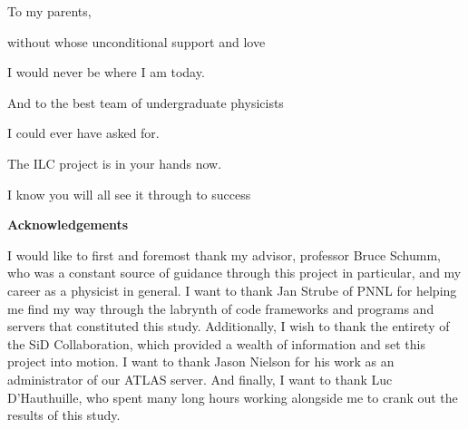 \documentclass{report}
\begin{document}
    \tableofcontents


    \newpage \vspace*{\fill}
        \begin{center} \begin{large}
            To my parents, 
            
            without whose unconditional support and love 
            
            I would never be where I am today.

            \vspace{40mm}

            And to the best team of undergraduate physicists
            
            I could ever have asked for.

            The ILC project is in your hands now.
            
            I know you will all see it through to success 
        \end{large} \end{center}
    \vspace*{\fill} \newpage \vspace*{\fill}
        \begin{center} \begin{large}
            \large \textbf{Acknowledgements} \vspace{\baselineskip}

            I would like to first and foremost thank my advisor, professor Bruce Schumm, who was a constant source of guidance through this project in particular, and my career as a physicist in general. I want to thank Jan Strube of PNNL for helping me find my way through the labrynth of code frameworks and programs and servers that constituted this study. Additionally, I wish to thank the entirety of the SiD Collaboration, which provided a wealth of information and set this project into motion. I want to thank Jason Nielson for his work as an administrator of our ATLAS server. And finally, I want to thank Luc D'Hauthuille, who spent many long hours working alongside me to crank out the results of this study.
        \end{large} \end{center}
    \vspace*{\fill} \newpage
\end{document}
